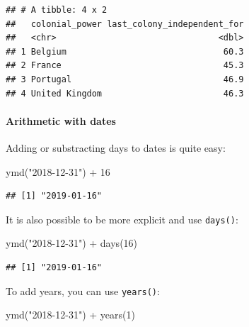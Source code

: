 \documentclass[
]{article}
\newenvironment{Shaded}{\begin{snugshade}}{\end{snugshade}}
\newcommand{\DecValTok}[1]{\textcolor[rgb]{0.00,0.00,0.81}{#1}}
\newcommand{\FunctionTok}[1]{\textcolor[rgb]{0.00,0.00,0.00}{#1}}
\newcommand{\NormalTok}[1]{#1}
\newcommand{\SpecialCharTok}[1]{\textcolor[rgb]{0.00,0.00,0.00}{#1}}
\newcommand{\StringTok}[1]{\textcolor[rgb]{0.31,0.60,0.02}{#1}}
\begin{document}
\begin{verbatim}
## # A tibble: 4 x 2
##   colonial_power last_colony_independent_for
##   <chr>                                <dbl>
## 1 Belgium                               60.3
## 2 France                                45.3
## 3 Portugal                              46.9
## 4 United Kingdom                        46.3
\end{verbatim}

\hypertarget{arithmetic-with-dates}{%
\paragraph{Arithmetic with dates}\label{arithmetic-with-dates}}

Adding or substracting days to dates is quite easy:

\begin{Shaded}
\begin{Highlighting}[]
\FunctionTok{ymd}\NormalTok{(}\StringTok{"2018{-}12{-}31"}\NormalTok{) }\SpecialCharTok{+} \DecValTok{16}
\end{Highlighting}
\end{Shaded}

\begin{verbatim}
## [1] "2019-01-16"
\end{verbatim}

It is also possible to be more explicit and use \texttt{days()}:

\begin{Shaded}
\begin{Highlighting}[]
\FunctionTok{ymd}\NormalTok{(}\StringTok{"2018{-}12{-}31"}\NormalTok{) }\SpecialCharTok{+} \FunctionTok{days}\NormalTok{(}\DecValTok{16}\NormalTok{)}
\end{Highlighting}
\end{Shaded}

\begin{verbatim}
## [1] "2019-01-16"
\end{verbatim}

To add years, you can use \texttt{years()}:

\begin{Shaded}
\begin{Highlighting}[]
\FunctionTok{ymd}\NormalTok{(}\StringTok{"2018{-}12{-}31"}\NormalTok{) }\SpecialCharTok{+} \FunctionTok{years}\NormalTok{(}\DecValTok{1}\NormalTok{)}
\end{Highlighting}
\end{Shaded}
\end{document}
